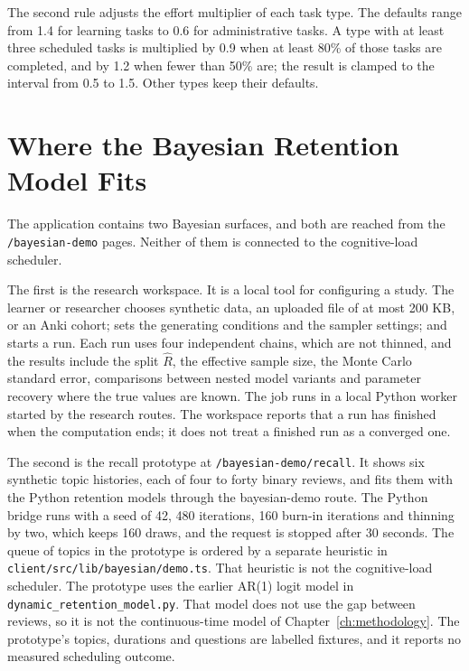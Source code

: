 The second rule adjusts the effort multiplier of each task type. The defaults range from 1.4 for learning tasks to 0.6 for administrative tasks. A type with at least three scheduled tasks is multiplied by 0.9 when at least 80\% of those tasks are completed, and by 1.2 when fewer than 50\% are; the result is clamped to the interval from 0.5 to 1.5. Other types keep their defaults.

\section{Where the Bayesian Retention Model Fits}
\label{sec:axiom-bayes}

The application contains two Bayesian surfaces, and both are reached from the \texttt{/bayesian-demo} pages. Neither of them is connected to the cognitive-load scheduler.

The first is the research workspace. It is a local tool for configuring a study. The learner or researcher chooses synthetic data, an uploaded file of at most 200 KB, or an Anki cohort; sets the generating conditions and the sampler settings; and starts a run. Each run uses four independent chains, which are not thinned, and the results include the split $\hat{R}$, the effective sample size, the Monte Carlo standard error, comparisons between nested model variants and parameter recovery where the true values are known. The job runs in a local Python worker started by the research routes. The workspace reports that a run has finished when the computation ends; it does not treat a finished run as a converged one.

The second is the recall prototype at \texttt{/bayesian-demo/recall}. It shows six synthetic topic histories, each of four to forty binary reviews, and fits them with the Python retention models through the bayesian-demo route. The Python bridge runs with a seed of 42, 480 iterations, 160 burn-in iterations and thinning by two, which keeps 160 draws, and the request is stopped after 30 seconds. The queue of topics in the prototype is ordered by a separate heuristic in \texttt{client/src/lib/bayesian/demo.ts}. That heuristic is not the cognitive-load scheduler. The prototype uses the earlier AR(1) logit model in \texttt{dynamic\_retention\_model.py}. That model does not use the gap between reviews, so it is not the continuous-time model of Chapter~\ref{ch:methodology}. The prototype's topics, durations and questions are labelled fixtures, and it reports no measured scheduling outcome.


